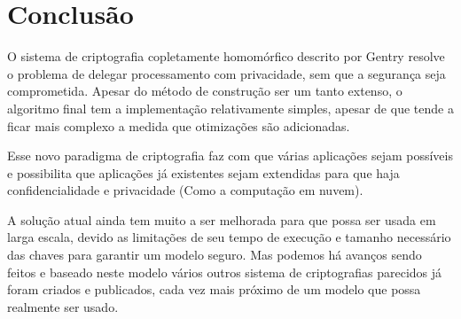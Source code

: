 \chapter{Conclusão}
\label{conclusao}
O sistema de criptografia copletamente homomórfico descrito por Gentry resolve o problema de delegar processamento com privacidade, sem que a segurança seja comprometida. Apesar do método de construção ser um tanto extenso, o algoritmo final  tem a implementação relativamente simples, apesar de que tende a ficar mais complexo a medida que otimizações são adicionadas.

Esse novo paradigma de criptografia faz com que várias aplicações sejam possíveis e possibilita que aplicações já existentes sejam extendidas para que haja confidencialidade e privacidade (Como a computação em nuvem).

A solução atual ainda tem muito a ser melhorada para que possa ser usada em larga escala, devido as limitações de seu tempo de execução e tamanho necessário das chaves para garantir um modelo seguro. Mas podemos há avanços sendo feitos e baseado neste modelo vários outros sistema de criptografias parecidos já foram criados e publicados, cada vez mais próximo de um modelo que possa realmente ser usado.